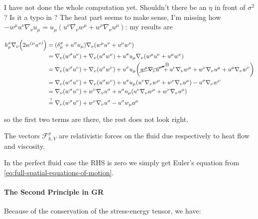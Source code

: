 \documentclass[main.tex]{subfiles}
\begin{document}
\begin{greenbox}
  I have not done the whole computation yet. Shouldn't there be an \(\eta\) in front of \(\sigma^2\)? Is it a typo in \cite[]{Taub:1978}?
  The heat part seems to make sense, I'm missing how \(-w^\mu u^\nu \nabla_\nu u_\mu = u_\mu (u^\nu \nabla_\nu w^\mu + w^\nu \nabla_\nu u^\mu)\): my results are

  \begin{subequations}
  \begin{align}
    h^\sigma _\mu \nabla_\nu \qty(2 w^{(\mu} u^{\nu)}) &=  (\delta_\mu ^\sigma + u^\sigma u_\mu) \nabla_\nu \qty(w^\mu u^\nu + u^\mu w^\nu)  \\
    &= \nabla_\nu \qty(w^\sigma u^\nu) + \nabla_\nu (u^\sigma w^\nu)
    + u^\sigma u_\mu \nabla_\nu \qty(w^\mu u^\nu + u^\mu w^\nu)  \\
    &= \nabla_\nu \qty(w^\sigma u^\nu) + \nabla_\nu (u^\sigma w^\nu)
    + u^\sigma u_\mu \qty(\cancelto{0}{ w^\mu \nabla_\nu u^\nu } + u^\nu \nabla_\nu w^\mu + w^\nu \nabla_\nu u^\mu + u^\mu \nabla_\nu w^\nu)  \\
    &= \nabla_\nu \qty(w^\sigma u^\nu) + \nabla_\nu (u^\sigma w^\nu)
    + u^\sigma u_\mu \qty(u^\nu \nabla_\nu w^\mu + w^\nu \nabla_\nu u^\mu) - u^\sigma \nabla_\nu w^\nu  \\
    &= \nabla_\nu \qty(w^\sigma u^\nu) + w^\nu \nabla_\nu u^\sigma
    + u^\sigma u_\mu \qty(u^\nu \nabla_\nu w^\mu + w^\nu \nabla_\nu u^\mu) \\
    &\overset{?}{=} \nabla_\nu \qty(w^\sigma u^\nu) + w^\nu \nabla_\nu u^\sigma
    - u^\sigma w_\mu a^\mu
  \end{align}
  \end{subequations}

  so the first two terms are there, the rest does not look right.
\end{greenbox}

The vectors \(\mathscr F^\sigma _{h, V}\) are relativistic forces on the fluid due respectively to heat flow and viscosity.

In the perfect fluid case the RHS is zero we simply get Euler's equation from \eqref{eq:full-spatial-equations-of-motion}.

\paragraph{The Second Principle in GR}


Because of the conservation of the stress-energy tensor, we have:
\end{document}
